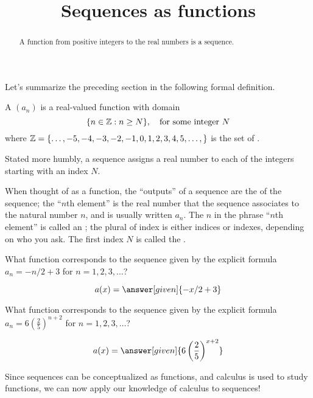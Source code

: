 \documentclass{ximera}
\title[Dig-In:]{Sequences as functions}
\begin{document}
\begin{abstract}
  A function from positive integers to the real numbers is a sequence.
\end{abstract}
\maketitle

Let's summarize the preceding section in the following formal definition.
\begin{definition}
  A  $(a_n)$ is a real-valued
  function with domain
  \[
  \{ n \in \mathbb Z : n \ge N \},\quad \text{for some integer $N$}
  \]
  where $\mathbb Z = \{\dots, -5,-4,-3,-2,-1,0,1,2,3,4,5,\dots,\}$ is the set
  of .
\end{definition}

Stated more humbly, a sequence assigns a real number to each of the integers
starting with an index $N$.

When thought of as a function, the ``outputs'' of a sequence are the
 of the sequence; the ``$n$th element'' is the real
number that the sequence associates to the natural number $n$, and is
usually written $a_n$.  The $n$ in the phrase
``$n$th element'' is called an ; the
plural of index is either indices or indexes, depending on who you
ask.  The first index $N$ is called the .

\begin{question}
  What function corresponds to the sequence given by the explicit formula
  $a_n = -n/2+3$ for $n=1,2,3,\dots$?
  \begin{prompt}
    \[
    a(x) = \answer[given]{-x/2 + 3}
    \]
  \end{prompt}
\end{question}

\begin{question}
  What function corresponds to the sequence given by the explicit formula
  $a_n = 6\left(\frac{2}{5}\right)^{n+2}$ for $n=1,2,3,\dots$?
  \begin{prompt}
    \[
    a(x) = \answer[given]{6\left(\frac{2}{5}\right)^{x+2}}
    \]
  \end{prompt}
\end{question}

Since sequences can be conceptualized as functions, and calculus is
used to study functions, we can now apply our knowledge of calculus to
sequences!
\end{document}
